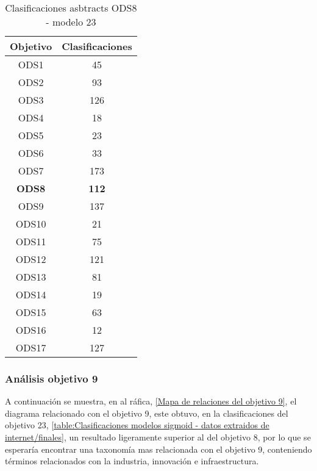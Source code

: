 \begin{table}[H]
    \begin{tabular}{| c | c |}
        \hline
        Objetivo & Clasificaciones \\
        \hline \hline
        ODS1   & 45  \\ \hline
        ODS2   & 93  \\ \hline
        ODS3   & 126 \\ \hline
        ODS4   & 18  \\ \hline
        ODS5   & 23  \\ \hline
        ODS6   & 33  \\ \hline
        ODS7   & 173 \\ \hline
        \textbf{ODS8}   & \textbf{112} \\ \hline
        ODS9   & 137 \\ \hline
        ODS10  & 21  \\ \hline
        ODS11  & 75  \\ \hline
        ODS12  & 121 \\ \hline
        ODS13  & 81  \\ \hline
        ODS14  & 19  \\ \hline
        ODS15  & 63  \\ \hline
        ODS16  & 12  \\ \hline
        ODS17  & 127 \\ \hline
    \end{tabular}
    \caption{Clasificaciones asbtracts ODS8 - modelo 23}
    \label{table:Clasificaciones asbtracts ODS8 - modelo 23}
\end{table}


\subsubsection{Análisis objetivo 9}
A continuación se muestra, en al ráfica, \cref{Mapa de relaciones del objetivo 9}, el
diagrama relacionado con el objetivo 9, este obtuvo, en la clasificaciones del
objetivo 23, \cref{table:Clasificaciones modelos sigmoid - datos extraidos de
internet/finales}, un resultado ligeramente superior al del objetivo 8, por lo
que se esperaría encontrar una taxonomía mas relacionada con el objetivo 9,
conteniendo términos relacionados con la industria, innovación e
infraestructura. 

